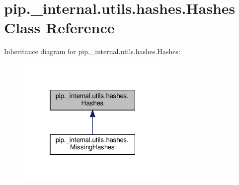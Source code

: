\hypertarget{classpip_1_1__internal_1_1utils_1_1hashes_1_1Hashes}{}\section{pip.\+\_\+internal.\+utils.\+hashes.\+Hashes Class Reference}
\label{classpip_1_1__internal_1_1utils_1_1hashes_1_1Hashes}


Inheritance diagram for pip.\+\_\+internal.\+utils.\+hashes.\+Hashes\+:
\nopagebreak
\begin{figure}[H]
\begin{center}
\leavevmode
\includegraphics[width=208pt]{classpip_1_1__internal_1_1utils_1_1hashes_1_1Hashes__inherit__graph}
\end{center}
\end{figure}
